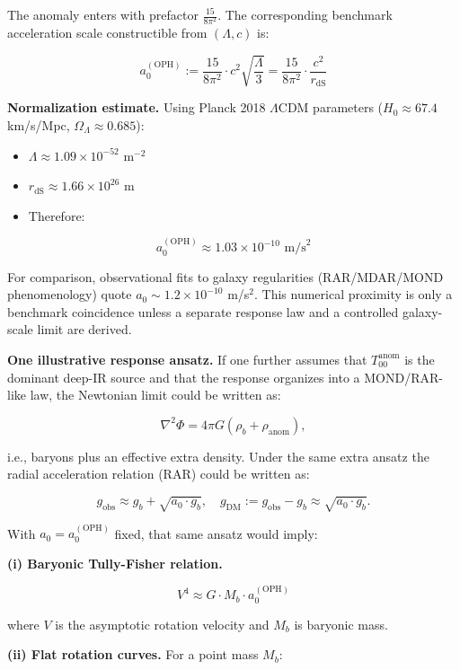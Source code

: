 The anomaly enters with prefactor \(\frac{15}{8\pi^2}\). The corresponding benchmark acceleration scale constructible from \((\Lambda, c)\) is:

\[
\boxed{
a_0^{\mathrm{(OPH)}} := \frac{15}{8\pi^2} \cdot c^2 \sqrt{\frac{\Lambda}{3}}
= \frac{15}{8\pi^2} \cdot \frac{c^2}{r_{\mathrm{dS}}}
}
\]

\textbf{Normalization estimate.} Using Planck 2018 \(\Lambda\)CDM parameters (\(H_0 \approx 67.4\) km/s/Mpc, \(\Omega_\Lambda \approx 0.685\)):

\begin{itemize}
\tightlist
\item
  \(\Lambda \approx 1.09 \times 10^{-52}\) m\(^{-2}\)
\item
  \(r_{\mathrm{dS}} \approx 1.66 \times 10^{26}\) m
\item
  Therefore:
\end{itemize}

\[
\boxed{
a_0^{\mathrm{(OPH)}} \approx 1.03 \times 10^{-10} \text{ m/s}^2
}
\]

For comparison, observational fits to galaxy regularities (RAR/MDAR/MOND phenomenology) quote \(a_0 \sim 1.2 \times 10^{-10}\) m/s\(^2\). This numerical proximity is only a benchmark coincidence unless a separate response law and a controlled galaxy-scale limit are derived.

\textbf{One illustrative response ansatz.} If one further assumes that \(T_{00}^{\mathrm{anom}}\) is the dominant deep-IR source and that the response organizes into a MOND/RAR-like law, the Newtonian limit could be written as:

\[
\nabla^2 \Phi = 4\pi G (\rho_b + \rho_{\mathrm{anom}}),
\]

i.e., baryons plus an effective extra density. Under the same extra ansatz the radial acceleration relation (RAR) could be written as:

\[
g_{\mathrm{obs}} \approx g_b + \sqrt{a_0 \cdot g_b},
\quad
g_{\mathrm{DM}} := g_{\mathrm{obs}} - g_b \approx \sqrt{a_0 \cdot g_b}.
\]

With \(a_0 = a_0^{\mathrm{(OPH)}}\) fixed, that same ansatz would imply:

\textbf{(i) Baryonic Tully-Fisher relation.}

\[
V^4 \approx G \cdot M_b \cdot a_0^{\mathrm{(OPH)}}
\]

where \(V\) is the asymptotic rotation velocity and \(M_b\) is baryonic mass.

\textbf{(ii) Flat rotation curves.} For a point mass \(M_b\):

